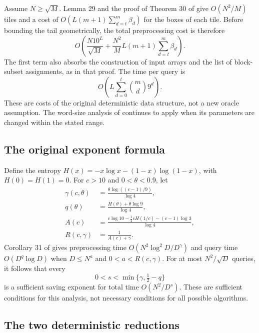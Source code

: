 \documentclass[11pt,a4paper]{article}
\theoremstyle{remark}
\begin{document}
Assume $N\geq\sqrt M$. Lemma 29 and the proof of Theorem 30 of \cite{AVW}
give $O(N^2/M)$ tiles and a cost of
$O(L(m+1)\sum_{d=t}^m\beta_d)$ for the boxes of each tile. Before bounding
the tail geometrically, the total preprocessing cost is therefore
\begin{equation}\label{eq:unrelaxed}
 O\left(\frac{N10^L}{\sqrt M}
       +\frac{N^2}{M}L(m+1)\sum_{d=t}^m\beta_d\right).
\end{equation}
The first term also absorbs the construction of input arrays and the list of
block-subset assignments, as in that proof. The time per query is
\begin{equation}\label{eq:query}
 O\left(L\sum_{d=0}^t\binom md9^d\right).
\end{equation}
These are costs of the original deterministic data structure, not a new
oracle assumption. The word-size analysis of \cite[Theorem 30]{AVW} continues
to apply when its parameters are changed within the stated range.

\subsection{The original exponent formula}

Define the entropy $H(x)=-x\log x-(1-x)\log(1-x)$, with $H(0)=H(1)=0$.
For $c>10$ and $0<\theta<0.9$, let
\begin{align}
 \gamma(c,\theta)&=\frac{\theta\log((c-1)/9)}{\log4},\label{eq:oldgamma}\\
 q(\theta)&=\frac{H(\theta)+\theta\log9}{\log4},\label{eq:q}\\
 A(c)&=\frac{c\log10-\tfrac12cH(1/c)-(c-1)\log3}{\log4},\label{eq:A}\\
 R(c,\gamma)&=\frac1{A(c)+\gamma}.\label{eq:R}
\end{align}
Corollary 31 of \cite{AVW} gives preprocessing time
$O(N^2\log^2 D/D^\gamma)$ and query time $O(D^q\log D)$ when
$D\leq N^a$ and $0<a<R(c,\gamma)$. For at most $N^2/\sqrt D$ queries, it
follows that every
\begin{equation}\label{eq:scondition}
 0<s<\min\{\gamma,\tfrac12-q\}
\end{equation}
is a sufficient saving exponent for total time $O(N^2/D^s)$.
These are sufficient conditions for this analysis, not necessary conditions
for all possible algorithms.

\subsection{The two deterministic reductions}\label{sec:reductions}
\end{document}
